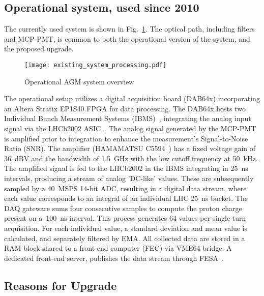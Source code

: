 \subsection{Operational system, used since 2010}
The currently used system is shown in Fig.~\ref{fig:current_system_processing}.
%
The optical path, including filters and MCP-PMT, is common to both the operational version of the system, and the proposed upgrade.
\begin{figure}[!tbh]
    \centering
    \texttt{[image: existing\_system\_processing.pdf]}
    \caption{Operational AGM system overview}
    \label{fig:current_system_processing}
\end{figure}
The operational setup utilizes a digital acquisition board (DAB64x) incorporating an Altera Stratix EP1S40 FPGA for data processing.
%
The DAB64x hosts two Individual Bunch Measurement Systems (IBMS)~\cite{ibms}, integrating the analog input signal via the LHCb2002 ASIC~\cite{lhcb_asic}.
%
The analog signal generated by  the MCP-PMT is amplified  prior to integration to  enhance the measurement's Signal-to-Noise Ratio  (SNR).
%
The amplifier (HAMAMATSU C5594~\cite{bsra_first_operation}) has a fixed voltage gain of \SI{36}{dBV} and the bandwidth of \SI{1.5}{GHz} with the low cutoff frequency at \SI{50}{kHz}.
%
The amplified signal is fed to the LHCb2002 in the IBMS integrating in \SI{25}{\nano\second} intervals, producing a stream of analog  'DC-like' values.
%
These are subsequently sampled by a \SI{40}{MSPS} 14-bit ADC, resulting in a digital data stream, where each value corresponds to an integral of an individual LHC \SI{25}{ns} bucket.
%
The DAQ gateware sums four consecutive samples to compute the
proton charge present on a~\SI{100}{ns} interval.
%
This process generates 64 values per single turn acquisition.
%
For each individual value, a standard deviation and mean value is calculated, and separately filtered by EMA. 
%
All collected data are stored in a RAM block shared to a front-end computer (FEC) via VME64 bridge.
%
A dedicated  front-end  server, publishes the data stream through FESA~\cite{fesa}.


\subsection{Reasons for Upgrade}

